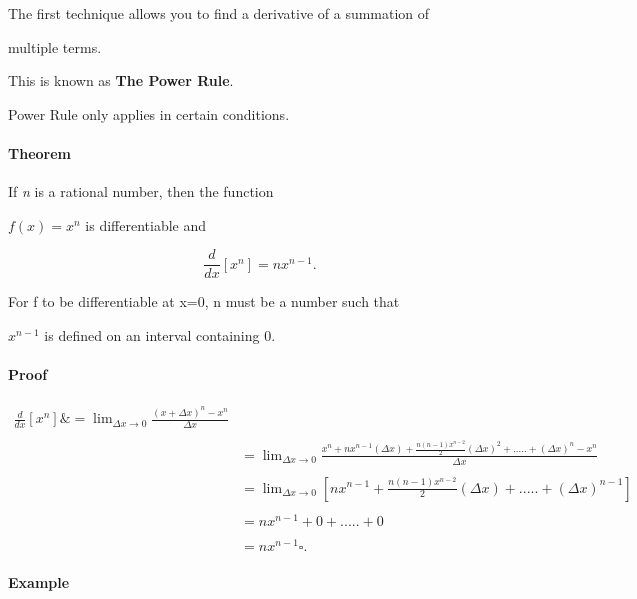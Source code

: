 {{{{The first technique allows you to find a derivative of a summation of

multiple terms.



This is known as \textbf{The Power Rule}.



Power Rule only applies in certain conditions.



\paragraph{Theorem}



If \textit{n} is a rational number, then the function

$f(x) = x^n$ is differentiable and



$$\frac {d}{dx} [x^n] = nx^{n-1}.$$



For f to be differentiable at x=0, n must be a number such that

$x^{n-1}$ is defined on an interval containing 0.



\paragraph{Proof}



$\begin{aligned}

\frac {d}{dx}[x^n]\&= \lim_{{\Delta}x\rightarrow 0} \frac {(x + {\Delta}x)^n - x^n}{{\Delta}x} \\\\&= \lim_{{\Delta}x\rightarrow 0} \frac{x^n + nx^{n-1} ({\Delta}x) + \frac {n(n-1)x^{n-2}}{2}({\Delta}x)^2 + ..... + ({\Delta}x)^n - x^n}{{\Delta}x} \\\\&= \lim_{{\Delta}x\rightarrow 0} \left[nx^{n-1} + \frac{n(n-1)x^{n-2}}{2}({\Delta}x) + ..... + ({\Delta}x)^{n-1}\right] \\\\&= nx^{n-1} + 0 + ..... + 0 \\\\&= nx^{n-1} {\square}.

\end{aligned}$



\paragraph{Example}



}}}}

